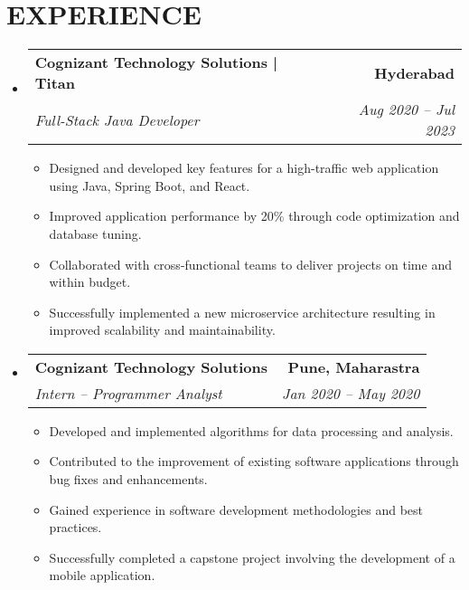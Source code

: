 \documentclass[letterpaper,11pt]{article}
\makeatletter
\newcommand{\resumeItem}[1]{\item\small{{#1 \vspace{-3pt}}}}
\newcommand{\resumeSubheading}[4]{\vspace{-2pt}\item\begin{tabular*}{0.97\textwidth}[t]{l@{\extracolsep{\fill}}r}\textbf{#1} & #2 \\ \textit{\small#3} & \textit{\small #4} \\ \end{tabular*}\vspace{-7pt}}
\newcommand{\resumeSubHeadingListStart}{\begin{itemize}[leftmargin=0.15in, label={}]}
\newcommand{\resumeSubHeadingListEnd}{\end{itemize}}
\newcommand{\resumeItemListStart}{\begin{itemize}}
\newcommand{\resumeItemListEnd}{\end{itemize}\vspace{-5pt}}
\makeatother
\begin{document}
\section{{\fontsize{9pt}{20pt}\selectfont \textbf{EXPERIENCE}}}\resumeSubHeadingListStart
\resumeSubheading{Cognizant Technology Solutions | Titan}{\textbf{Hyderabad}}{Full-Stack Java Developer}{Aug 2020 – Jul 2023}
\resumeItemListStart
\resumeItem{Designed and developed key features for a high-traffic web application using Java, Spring Boot, and React.}
\resumeItem{Improved application performance by 20\% through code optimization and database tuning.}
\resumeItem{Collaborated with cross-functional teams to deliver projects on time and within budget.}
\resumeItem{Successfully implemented a new microservice architecture resulting in improved scalability and maintainability.}
\resumeItemListEnd
\resumeSubheading{Cognizant Technology Solutions}{\textbf{Pune, Maharastra}}{Intern – Programmer Analyst}{Jan 2020 – May 2020}
\resumeItemListStart
\resumeItem{Developed and implemented algorithms for data processing and analysis.}
\resumeItem{Contributed to the improvement of existing software applications through bug fixes and enhancements.}
\resumeItem{Gained experience in software development methodologies and best practices.}
\resumeItem{Successfully completed a capstone project involving the development of a mobile application.}
\resumeItemListEnd
\resumeSubHeadingListEnd\vspace{-17pt}
\end{document}
